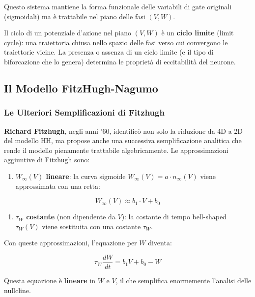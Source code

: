 Questo sistema mantiene la forma funzionale delle variabili di gate originali (sigmoidali) ma è trattabile nel piano delle fasi $(V, W)$.

Il ciclo di un potenziale d'azione nel piano $(V, W)$ è un \textbf{ciclo limite} (limit cycle): una traiettoria chiusa nello spazio delle fasi verso cui convergono le traiettorie vicine. La presenza o assenza di un ciclo limite (e il tipo di biforcazione che lo genera) determina le proprietà di eccitabilità del neurone.



\subsection{Il Modello FitzHugh-Nagumo}

\subsubsection{Le Ulteriori Semplificazioni di Fitzhugh}

\textbf{Richard Fitzhugh}, negli anni '60, identificò non solo la riduzione da 4D a 2D del modello HH, ma propose anche una successiva semplificazione analitica che rende il modello pienamente trattabile algebricamente. Le approssimazioni aggiuntive di Fitzhugh sono:

\begin{enumerate}
    \item \textbf{$W_\infty(V)$ lineare}: la curva sigmoide $W_\infty(V) = a \cdot n_\infty(V)$ viene approssimata con una retta:
\end{enumerate}

\begin{equation}
W_\infty(V) \approx b_1 \cdot V + b_0
\end{equation}

\begin{enumerate}
    \item[2.] \textbf{$\tau_W$ costante} (non dipendente da $V$): la costante di tempo bell-shaped $\tau_W(V)$ viene sostituita con una costante $\tau_W$.
\end{enumerate}

Con queste approssimazioni, l'equazione per $W$ diventa:

\begin{equation}
\tau_W \frac{dW}{dt} = b_1 V + b_0 - W
\end{equation}

Questa equazione è \textbf{lineare} in $W$ e $V$, il che semplifica enormemente l'analisi delle nullcline.

